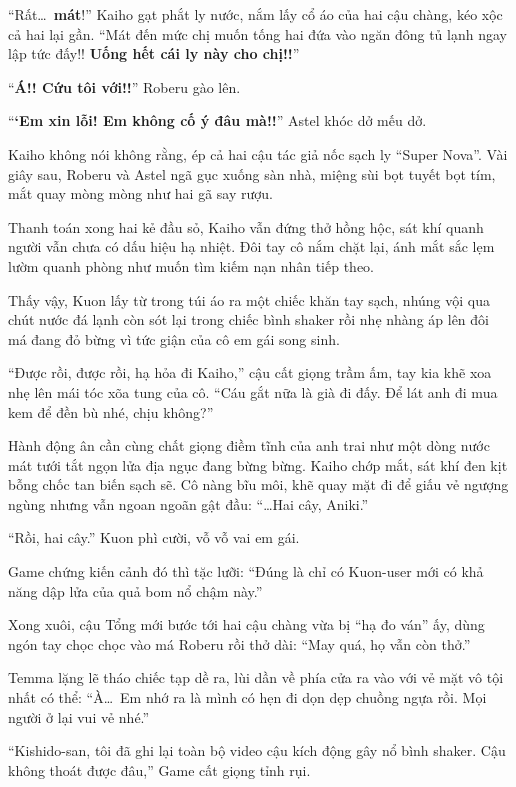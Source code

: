 \documentclass[../main.tex]{subfiles}
\begin{document}
``Rất\dots\ \textbf{mát}!'' Kaiho gạt phắt ly nước, nắm lấy cổ áo của hai cậu chàng, kéo xộc cả hai lại gần. ``Mát đến mức chị muốn tống hai đứa vào ngăn đông tủ lạnh ngay lập tức đấy!! \textbf{Uống hết cái ly này cho chị!!}''

``\textbf{Á!! Cứu tôi với!!}'' Roberu gào lên.

``\textbf{`Em xin lỗi! Em không cố ý đâu mà!!}'' Astel khóc dở mếu dở.

Kaiho không nói không rằng, ép cả hai cậu tác giả nốc sạch ly ``Super Nova''. Vài giây sau, Roberu và Astel ngã gục xuống sàn nhà, miệng sùi bọt tuyết bọt tím, mắt quay mòng mòng như hai gã say rượu.

Thanh toán xong hai kẻ đầu sỏ, Kaiho vẫn đứng thở hồng hộc, sát khí quanh người vẫn chưa có dấu hiệu hạ nhiệt. Đôi tay cô nắm chặt lại, ánh mắt sắc lẹm lườm quanh phòng như muốn tìm kiếm nạn nhân tiếp theo.

Thấy vậy, Kuon lấy từ trong túi áo ra một chiếc khăn tay sạch, nhúng vội qua chút nước đá lạnh còn sót lại trong chiếc bình shaker rồi nhẹ nhàng áp lên đôi má đang đỏ bừng vì tức giận của cô em gái song sinh.

``Được rồi, được rồi, hạ hỏa đi Kaiho,'' cậu cất giọng trầm ấm, tay kia khẽ xoa nhẹ lên mái tóc xõa tung của cô. ``Cáu gắt nữa là già đi đấy. Để lát anh đi mua kem để đền bù nhé, chịu không?''

Hành động ân cần cùng chất giọng điềm tĩnh của anh trai như một dòng nước mát tưới tắt ngọn lửa địa ngục đang bừng bừng. Kaiho chớp mắt, sát khí đen kịt bỗng chốc tan biến sạch sẽ. Cô nàng bĩu môi, khẽ quay mặt đi để giấu vẻ ngượng ngùng nhưng vẫn ngoan ngoãn gật đầu: ``\dots Hai cây, Aniki.''

``Rồi, hai cây.'' Kuon phì cười, vỗ vỗ vai em gái.

Game chứng kiến cảnh đó thì tặc lưỡi: ``Đúng là chỉ có Kuon-user mới có khả năng dập lửa của quả bom nổ chậm này.''

Xong xuôi, cậu Tổng mới bước tới hai cậu chàng vừa bị ``hạ đo ván'' ấy, dùng ngón tay chọc chọc vào má Roberu rồi thở dài: ``May quá, họ vẫn còn thở.''

Temma lặng lẽ tháo chiếc tạp dề ra, lùi dần về phía cửa ra vào với vẻ mặt vô tội nhất có thể: ``À\dots\ Em nhớ ra là mình có hẹn đi dọn dẹp chuồng ngựa rồi. Mọi người ở lại vui vẻ nhé.''

``Kishido-san, tôi đã ghi lại toàn bộ video cậu kích động gây nổ bình shaker. Cậu không thoát được đâu,'' Game cất giọng tỉnh rụi.
\end{document}
